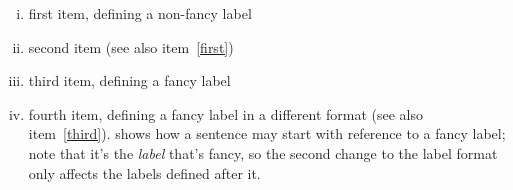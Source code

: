 \documentclass{article}
\begin{document}
%
\begin{enumerate}[(i)]
\item first item, defining a non-fancy label \label{first}
%
\item second item (see also item~\ref{first})
%
%
\item third item, defining a fancy label \label{third}
%
%
\item fourth item, defining a fancy label in a different format (see
  also item~\ref{third}).   shows how a sentence may start
  with reference to a fancy label; note that it's the \emph{label}
  that's fancy, so the second change to the label format only affects
  the labels defined after it.  \label{fourth}
\end{enumerate}
\end{document}
